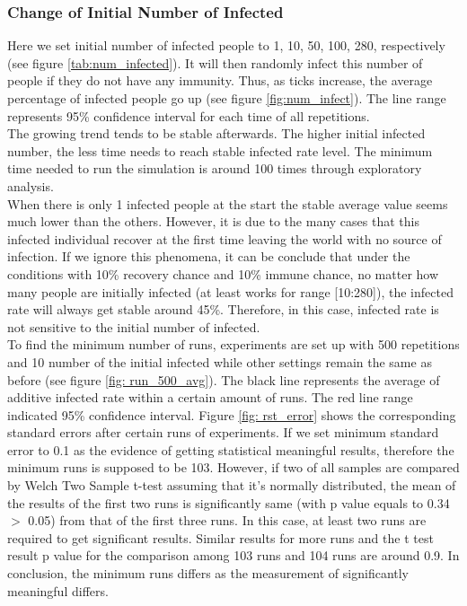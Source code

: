 \documentclass[a4paper,reqno,]{article}
\begin{document}
\subsubsection{Change of Initial Number of Infected}
Here we set initial number of infected people to 1, 10, 50, 100, 280, respectively (see figure \ref{tab:num_infected}). It will then randomly infect this number of people if they do not have any immunity. Thus, as ticks increase, the average percentage of infected people go up (see figure \ref{fig:num_infect}). The line range represents 95\% confidence interval for each time of all repetitions. 
\\The growing trend tends to be stable afterwards. The higher initial infected number, the less time needs to reach stable infected rate level. The minimum time needed to run the simulation is around 100 times through exploratory analysis.
\\When there is only 1 infected people at the start the stable average value seems much lower than the others. However, it is due to the many cases that this infected individual recover at the first time leaving the world with no source of infection. If we ignore this phenomena, it can be conclude that under the conditions with 10\% recovery chance and 10\% immune chance, no matter how many people are initially infected (at least works for range [10:280]), the infected rate will always get stable around 45\%. Therefore, in this case, infected rate is not sensitive to the initial number of infected.
\\To find the minimum number of runs, experiments are set up with 500 repetitions and 10 number of the initial infected while other settings remain the same as before (see figure \ref{fig: run_500_avg}). The black line represents the average of additive infected rate within a certain amount of runs. The red line range indicated 95\% confidence interval.  Figure \ref{fig: rst_error} shows the corresponding standard errors after certain runs of experiments. If we set minimum standard error to 0.1 as the evidence of getting statistical meaningful results, therefore the minimum runs is supposed to be 103. However, if two of all samples are compared by Welch Two Sample t-test assuming that it's normally distributed, the mean of the results of the first two runs is significantly same (with p value equals to 0.34 $>$ 0.05) from that of the first three runs. In this case, at least two runs are required to get significant results. Similar results for more runs and the t test result p value for the comparison among 103 runs and 104 runs are around 0.9. In conclusion, the minimum runs differs as the measurement of significantly meaningful differs.
\end{document}
